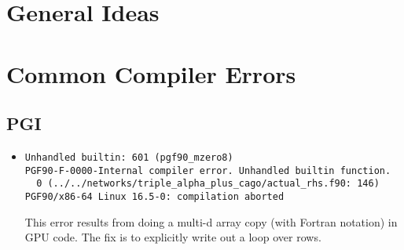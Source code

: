 \section{General Ideas}



\section{Common Compiler Errors}

\subsection{PGI}

\begin{itemize}
  \item 
    \begin{verbatim}
Unhandled builtin: 601 (pgf90_mzero8)
PGF90-F-0000-Internal compiler error. Unhandled builtin function.       
  0 (../../networks/triple_alpha_plus_cago/actual_rhs.f90: 146)
PGF90/x86-64 Linux 16.5-0: compilation aborted
\end{verbatim}

    This error results from doing a multi-d array copy (with Fortran
    notation) in GPU code.  The fix is to explicitly write out a loop
    over rows.

\end{itemize}

